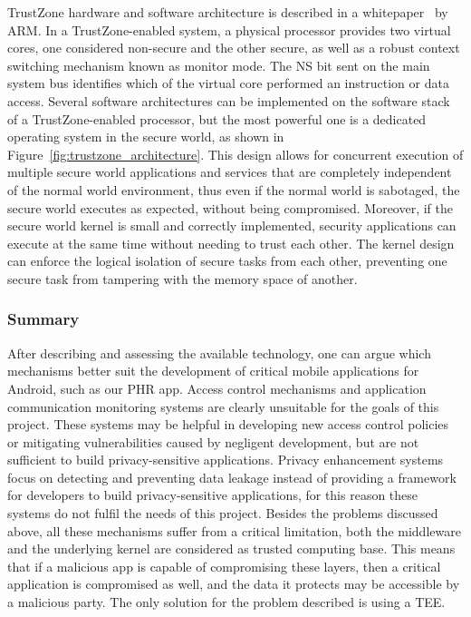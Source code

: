 TrustZone hardware and software architecture is described in a whitepaper~\cite{trustzone_whitepaper} by ARM. In a TrustZone-enabled system, a physical processor provides two virtual cores, one considered non-secure and the other secure, as well as a robust context switching mechanism known as monitor mode. The NS bit sent on the main system bus identifies which of the virtual core performed an instruction or data access. Several software architectures can be implemented on the software stack of a TrustZone-enabled processor, but the most powerful one is a dedicated operating system in the secure world, as shown in Figure~\ref{fig:trustzone_architecture}. This design allows for concurrent execution of multiple secure world applications and services that are completely independent of the normal world environment, thus even if the normal world is sabotaged, the secure world executes as expected, without being compromised. Moreover, if the secure world kernel is small and correctly implemented, security applications can execute at the same time without needing to trust each other. The kernel design can enforce the logical isolation of secure tasks from each other, preventing one secure task from tampering with the memory space of another.

\subsubsection{Summary}

After describing and assessing the available technology, one can argue which mechanisms better suit the development of critical mobile applications for Android, such as our \ac{PHR} app. Access control mechanisms and application communication monitoring systems are clearly unsuitable for the goals of this project.
These systems may be helpful in developing new access control policies or mitigating vulnerabilities caused by negligent development, but are not sufficient to build privacy-sensitive applications. %
Privacy enhancement systems focus on detecting and preventing data leakage instead of providing a framework for developers to build privacy-sensitive applications, for this reason these systems do not fulfil the needs of this project. %
Besides the problems discussed above, all these mechanisms suffer from a critical limitation, both the middleware and the underlying kernel are considered as trusted computing base. This means that if a malicious app is capable of compromising these layers, then a critical application is compromised as well, and the data it protects may be accessible by a malicious party. The only solution for the problem described is using a \ac{TEE}. %

